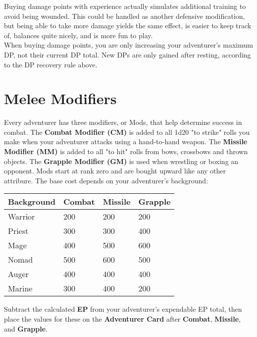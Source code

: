 \begin{multicols*}{2}
Buying damage points with experience actually simulates additional training to avoid being wounded. This could be handled as another defensive modification, but being able to take more damage yields the same effect, is easier to keep track of, balances quite nicely, and is more fun to play.\\
When buying damage points, you are only increasing your adventurer’s maximum DP, not their current DP total. New DPs are only gained after resting, according to the DP recovery rule above.
\section{Melee Modifiers}
Every adventurer has three modifiers, or Mods, that help determine success in combat. The \textbf{Combat Modifier (CM)} is added to all 1d20 "to strike" rolls you make when
your adventurer attacks using a hand-to-hand weapon. The \textbf{Missile Modifier (MM)} is added to all "to hit" rolls from bows, crossbows and thrown objects. The \textbf{Grapple Modifier (GM)} is used when wrestling or boxing an opponent. Mods start at rank zero and are bought upward like any other attribure. The base cost depends on your adventurer’s background:

\begin{tcolorbox}[breakable,boxrule=0pt]
\begin{tabular}{l l l l}
\textbf{Background} & \textbf{Combat} & \textbf{Missile} & \textbf{Grapple}\\
\midrule
Warrior & 200 & 200 & 200\\
Priest & 300 & 300 & 400\\
Mage & 400 & 500 & 600\\
Nomad & 500 & 600 & 500\\
Auger & 400 & 400 & 400\\
Marine & 300 & 400 & 200\\
\end{tabular}
\end{tcolorbox}
Subtract the calculated \textbf{EP} from your adventurer’s expendable EP total, then place the values for these on the \textbf{Adventurer Card} after \textbf{Combat}, \textbf{Missile}, and \textbf{Grapple}.

\end{multicols*}
